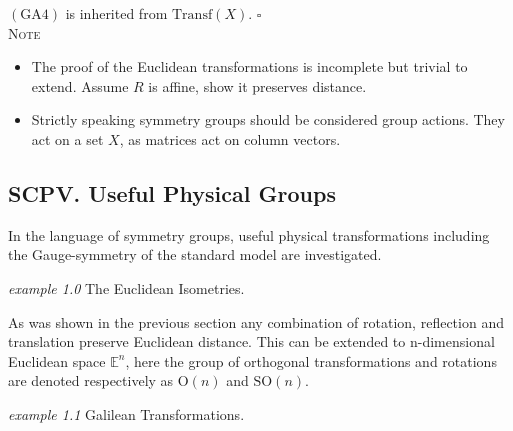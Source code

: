 \documentclass[twocolumn,floatfix,aps,prd,amsmath,amssymb]{revtex4}
\begin{document}
$(\mathrm{GA}4)$ is inherited from $\mathrm{Transf}(X)$. \hfill $\square$\\

\textsc{Note}
\begin{itemize}
\item The proof of the Euclidean transformations is incomplete but trivial to extend. Assume $R$ is affine, show it preserves distance.
\item Strictly speaking symmetry groups should be considered group actions. They act on a set $X$, as matrices act on column vectors.
\end{itemize}
\subsection{SCPV. Useful Physical Groups}

In the language of symmetry groups, useful physical transformations including the Gauge-symmetry of the standard model are investigated.

\begin{flushleft}\textit{example 1.0} The Euclidean Isometries. \end{flushleft}

As was shown in the previous section any combination of rotation, reflection and translation preserve Euclidean distance. This can be extended to n-dimensional Euclidean space $\mathbb{E}^n$, here the group of orthogonal transformations and rotations are denoted respectively as $\mathrm{O}(n)$ and $\mathrm{SO}(n)$.

\begin{flushleft}\textit{example 1.1} Galilean Transformations.\end{flushleft}
\end{document}

